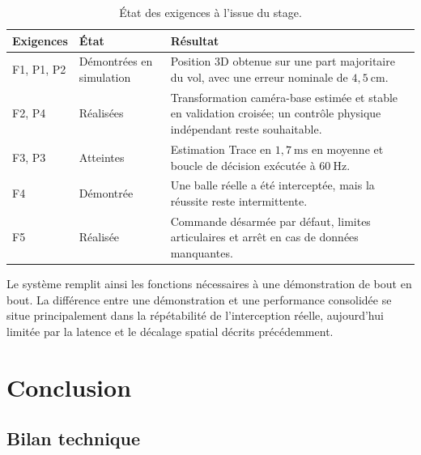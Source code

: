 \documentclass[a4paper,11pt]{report}
\begin{document}
\begin{table}[H]
  \centering
  \caption{État des exigences à l'issue du stage.}
  \label{tab:bilan-cahier-charges}
  \small
  \begin{tabular}{L{0.13\textwidth}L{0.18\textwidth}L{0.59\textwidth}}
    \toprule
    Exigences & État & Résultat \\
    \midrule
    F1, P1, P2 & Démontrées en simulation & Position 3D obtenue sur une part majoritaire du vol, avec une erreur nominale de \(4{,}5~\text{cm}\). \\
    F2, P4 & Réalisées & Transformation caméra-base estimée et stable en validation croisée; un contrôle physique indépendant reste souhaitable. \\
    F3, P3 & Atteintes & Estimation Trace en \(1{,}7~\text{ms}\) en moyenne et boucle de décision exécutée à \(60~\text{Hz}\). \\
    F4 & Démontrée & Une balle réelle a été interceptée, mais la réussite reste intermittente. \\
    F5 & Réalisée & Commande désarmée par défaut, limites articulaires et arrêt en cas de données manquantes. \\
    \bottomrule
  \end{tabular}
\end{table}

Le système remplit ainsi les fonctions nécessaires à une démonstration de bout
en bout. La différence entre une démonstration et une performance consolidée se
situe principalement dans la répétabilité de l'interception réelle, aujourd'hui
limitée par la latence et le décalage spatial décrits précédemment.

\chapter{Conclusion}

\section*{Bilan technique}
\end{document}
